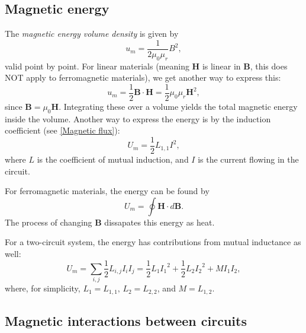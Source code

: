 \documentclass[a4paper, 12pt]{article}
\renewcommand{\vec}[1]{\mathbf{#1}}
\newcommand{\B}{\ensuremath{\vec{B}}}
\renewcommand{\H}{\ensuremath{\vec{H}}}
\begin{document}
    \subsection{Magnetic energy}
        The \textit{magnetic energy volume density} is given by
        \begin{equation}
            u_m = \frac{1}{2\mu_0\mu_r}B^2,
        \end{equation}
        valid point by point. 
        For linear materials (meaning \H{} is linear in \B, this does NOT apply to ferromagnetic materials), we get another way to express this: 
        \begin{equation}
            u_m = \frac{1}{2}\B\cdot\H = \frac{1}{2}\mu_0\mu_r\H^2,
        \end{equation}
        since $\B = \mu_0\H{}$. Integrating these over a volume yields the total magnetic energy inside the volume.
        Another way to express the energy is by the induction coefficient (see \ref{Magnetic flux}):
        \begin{equation}
            U_m = \frac{1}{2}L_{1,1}I^2,
        \end{equation}
        where $L$ is the coefficient of mutual induction, and $I$ is the current flowing in the circuit.

        For ferromagnetic materials, the energy can be found by
        \begin{equation}
            U_m = \oint \H \cdot d\B.
        \end{equation}
        The process of changing \B{} dissapates this energy as heat.

        For a two-circuit system, the energy has contributions from mutual inductance as well: 
        \begin{equation}
            U_m = \sum_{i,j}\frac{1}{2}L_{i,j}I_iI_j = \frac{1}{2}L_1{I_1}^2 + \frac{1}{2}L_2{I_2}^2 + MI_1I_2,
        \end{equation}
        where, for simplicity, $L_1 = L_{1,1},\, L_2 = L_{2,2}$, and $M = L_{1,2}$.
    
    \subsection{Magnetic interactions between circuits}
\end{document}
